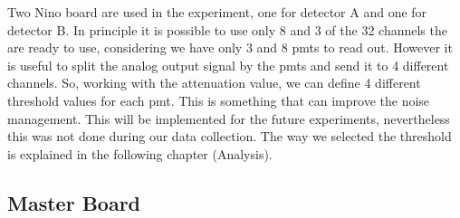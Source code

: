 Two Nino board are used in the experiment, one for detector A and one for detector B. In principle it is possible to use only 8 and 3 of the 32 channels the are ready to use, considering we have only 3 and 8 pmts to read out. However it is useful to split the analog output signal by the pmts and send it to 4 different channels. So, working with the attenuation value, we can define 4 different threshold values for each pmt. This is something that can improve the noise management. This will be implemented for the future experiments, nevertheless this was not done during our data collection.
The way we selected the threshold is explained in the following chapter (Analysis).

\subsection{Master Board}